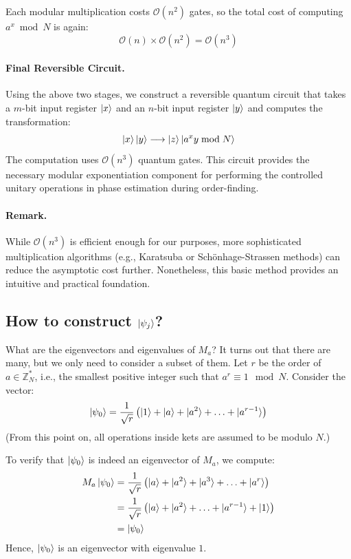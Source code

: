 Each modular multiplication costs $\mathcal{O}(n^2)$ gates, so the total cost of computing $a^x \bmod N$ is again:
\[
\mathcal{O}(n) \times \mathcal{O}(n^2) = \mathcal{O}(n^3)
\]

\paragraph{Final Reversible Circuit.}  
Using the above two stages, we construct a reversible quantum circuit that takes a $m$-bit input register $\ket{x}$ and an $n$-bit input register $\ket{y}$ and computes the transformation:
\[
\ket{x}\ket{y} \longrightarrow \ket{z} \ket{a^x y \bmod N}
\]
The computation uses $\mathcal{O}(n^3)$ quantum gates. This circuit provides the necessary modular exponentiation component for performing the controlled unitary operations in phase estimation during order-finding.

\paragraph{Remark.}  
While $\mathcal{O}(n^3)$ is efficient enough for our purposes, more sophisticated multiplication algorithms (e.g., Karatsuba or Schönhage-Strassen methods) can reduce the asymptotic cost further. Nonetheless, this basic method provides an intuitive and practical foundation.

\subsection{How to construct \texorpdfstring{$\ket{\psi_j}$}{psij}?}

What are the eigenvectors and eigenvalues of $M_a$? It turns out that there are many, but we only need to consider a subset of them. Let $r$ be the order of $a \in \mathbb{Z}_N^*$, i.e., the smallest positive integer such that $a^r \equiv 1 \mod N$. Consider the vector:
\[
\ket{\psi_0} = \frac{1}{\sqrt{r}} \left( \ket{1} + \ket{a} + \ket{a^2} + \ldots + \ket{a^{r-1}} \right)
\]
(From this point on, all operations inside kets are assumed to be modulo $N$.)

To verify that $\ket{\psi_0}$ is indeed an eigenvector of $M_a$, we compute:
\begin{align*}
    M_a \ket{\psi_0} &= \frac{1}{\sqrt{r}} \left( \ket{a} + \ket{a^2} + \ket{a^3} + \ldots + \ket{a^r} \right) \\
    &= \frac{1}{\sqrt{r}} \left( \ket{a} + \ket{a^2} + \ldots + \ket{a^{r-1}} + \ket{1} \right) \\
    &= \ket{\psi_0}
\end{align*}
Hence, $\ket{\psi_0}$ is an eigenvector with eigenvalue $1$.

